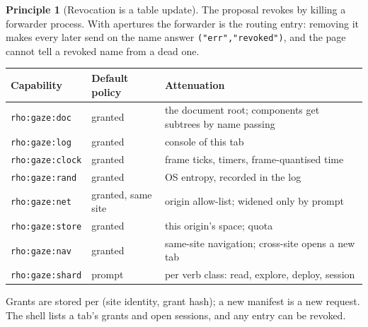 \documentclass[11pt]{article}
\theoremstyle{definition}
\newtheorem{principle}{Principle}
\theoremstyle{remark}
\newcommand{\code}[1]{\texttt{#1}}
\begin{document}
\begin{principle}[Revocation is a table update]
The proposal revokes by killing a forwarder process. With apertures the forwarder is
the routing entry: removing it makes every later send on the name answer
\code{("err","revoked")}, and the page cannot tell a revoked name from a dead one.
\end{principle}

\begin{center}\small
\begin{tabularx}{\linewidth}{@{}p{2.7cm}p{3.1cm}X@{}}
\toprule
Capability & Default policy & Attenuation\\
\midrule
\code{rho:gaze:doc} & granted & the document root; components get subtrees by name passing\\
\code{rho:gaze:log} & granted & console of this tab\\
\code{rho:gaze:clock} & granted & frame ticks, timers, frame-quantised time\\
\code{rho:gaze:rand} & granted & OS entropy, recorded in the log\\
\code{rho:gaze:net} & granted, same site & origin allow-list; widened only by prompt\\
\code{rho:gaze:store} & granted & this origin's space; quota\\
\code{rho:gaze:nav} & granted & same-site navigation; cross-site opens a new tab\\
\code{rho:gaze:shard} & prompt & per verb class: read, explore, deploy, session\\
\bottomrule
\end{tabularx}
\end{center}

\noindent
Grants are stored per (site identity, grant hash); a new manifest is a new request.
The shell lists a tab's grants and open sessions, and any entry can be revoked.
\end{document}
